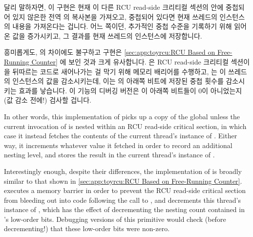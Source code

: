 \fi

달리 말하자면, 이  구현은 현재  이 다른
RCU read-side 크리티컬 섹션의 안에 중첩되어 있지 않은한 전역  의
복사본을 가져오고, 중첩되어 있다면 현재 쓰레드의  인스턴스의
내용을 가져온다는 겁니다.
어느 쪽이던, 추가적인 중첩 수준을 기록하기 위해 읽어온 값을 증가시키고, 그
결과를 현재 쓰레드의  인스턴스에 저장합니다.

\begin{fcvref}
흥미롭게도,  의 차이에도 불구하고 
구현은
\cref{sec:app:toyrcu:RCU Based on Free-Running Counter}
에 보인 것과 크게 유사합니다.
 은 RCU read-side 크리티컬 섹션이  을
뒤따르는 코드로 새어나가는 걸 막기 위해 메모리 배리어를 수행하고,
 는 이 쓰레드의  인스턴스의 값을 감소시키는데,
이는  의 아래쪽 비트에 저장된 중첩 횟수를 감소시키는 효과를
낳습니다.
이 기능의 디버깅 버전은 이 아래쪽 비트들이 0이 아니었는지 (값 감소 전에!)
검사할 겁니다.
\end{fcvref}

\iffalse

In other words, this implementation of  picks up a copy
of the global  unless the current invocation of
 is nested within an RCU read-side critical section,
in which case it instead fetches the contents of the current thread's
instance of .
Either way, it increments whatever value it fetched in order to record
an additional nesting level, and stores the result in the current
thread's instance of .

\begin{fcvref}
Interestingly enough, despite their  differences,
the implementation of 
is broadly similar to that shown in
\cref{sec:app:toyrcu:RCU Based on Free-Running Counter}.
 executes a memory barrier
in order to prevent the RCU read-side
critical section from bleeding out into code following the call
to , and
 decrements this thread's instance of ,
which has the effect of decrementing the nesting count contained in
's low-order bits.
Debugging versions of this primitive would check (before decrementing!)
that these low-order bits were non-zero.
\end{fcvref}

